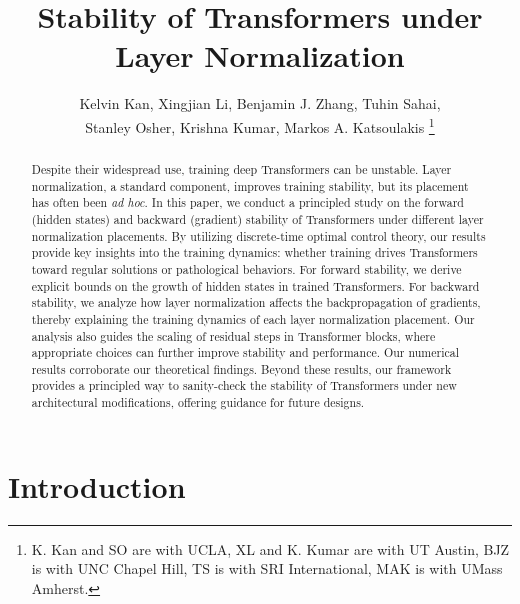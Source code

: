 \documentclass[journal]{IEEEtran}
\theoremstyle{plain}
\theoremstyle{definition}
\theoremstyle{remark}
\begin{document}
\title{Stability of Transformers under Layer Normalization}


\author{ Kelvin Kan, Xingjian Li, Benjamin J. Zhang, Tuhin Sahai, \\Stanley Osher, Krishna Kumar, 
Markos A. Katsoulakis
\thanks{K. Kan and SO are with UCLA, XL and K. Kumar are with UT Austin, BJZ is with UNC Chapel Hill, TS is with SRI International, MAK is with UMass Amherst.}}


\maketitle

\begin{abstract}
    Despite their widespread use, training deep Transformers can be unstable. 
    Layer normalization, a standard component, improves training stability, but its placement has often
    been \emph{ad hoc}.
    In this paper, we conduct a principled study on the forward (hidden states) and backward (gradient) stability of Transformers under different layer normalization placements. By utilizing discrete-time optimal control theory, our results provide key insights into the training dynamics: whether training drives Transformers toward regular solutions or pathological behaviors. 
    For forward stability, we derive explicit bounds on the growth of hidden states in trained Transformers. For backward stability, we analyze how layer normalization affects the backpropagation of gradients, thereby explaining the training dynamics of each layer normalization placement.
    Our analysis also guides the scaling of residual steps in Transformer blocks, where appropriate choices can further improve stability and performance. Our numerical results corroborate our theoretical findings. Beyond these results, our framework provides a principled way to sanity-check 
    the stability of Transformers under new architectural modifications, offering guidance for future designs.
\end{abstract}


\IEEEpeerreviewmaketitle



\section{Introduction}
\end{document}
